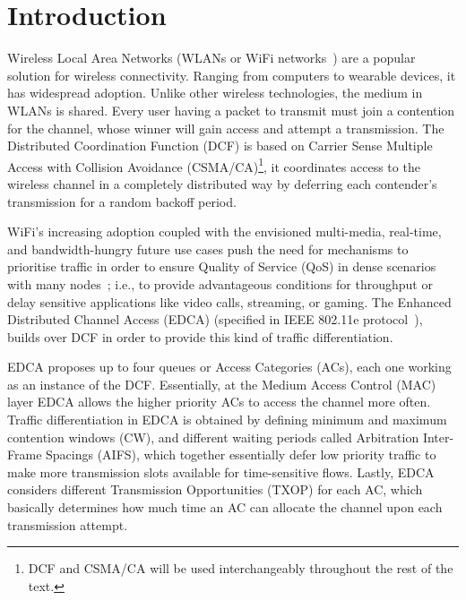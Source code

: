 \documentclass[a4paper]{article}
\begin{document}
\section{Introduction}
Wireless Local Area Networks (WLANs or WiFi networks~\cite{802Standards}) are a popular solution for wireless connectivity. Ranging from computers to wearable devices, it has widespread adoption. Unlike other wireless technologies, the medium in WLANs is shared. Every user having a packet to transmit must join a contention for the channel, whose winner will gain access and attempt a transmission. The Distributed Coordination Function (DCF) is based on Carrier Sense Multiple Access with Collision Avoidance (CSMA/CA)\footnote{DCF and CSMA/CA will be used interchangeably throughout the rest of the text.}, it coordinates access to the wireless channel in a completely distributed way by deferring each contender's transmission for a random backoff period.

WiFi's increasing adoption coupled with the envisioned multi-media, real-time, and bandwidth-hungry future use cases push the need for mechanisms to prioritise traffic in order to ensure Quality of Service (QoS) in dense scenarios with many nodes~\cite{HEW-scenarios,bellalta2015WCM}; i.e., to provide advantageous conditions for throughput or delay sensitive applications like video calls, streaming, or gaming. The Enhanced Distributed Channel Access (EDCA) (specified in IEEE 802.11e protocol~\cite{80211e}), builds over DCF in order to provide this kind of traffic differentiation.

EDCA proposes up to four queues or Access Categories (ACs), each one working as an instance of the DCF. Essentially, at the Medium Access Control (MAC) layer EDCA allows the higher priority ACs to access the channel more often. Traffic differentiation in EDCA is obtained by defining minimum and maximum contention windows (CW), and different waiting periods called Arbitration Inter-Frame Spacings (AIFS), which together essentially defer low priority traffic to make more transmission slots available for time-sensitive flows. Lastly, EDCA considers different Transmission Opportunities (TXOP) for each AC, which basically determines how much time an AC can allocate the channel upon each transmission attempt.
\end{document}
